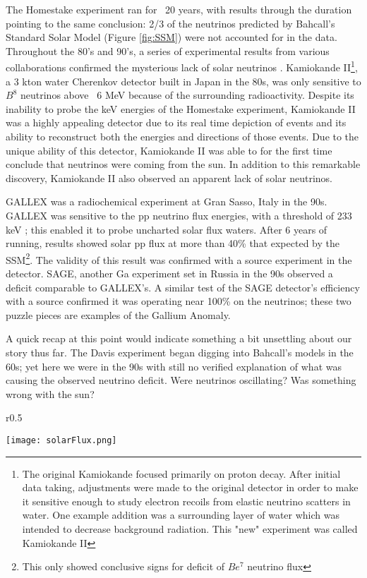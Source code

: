 \documentclass[12pt]{article}
\begin{document}
\par The Homestake experiment ran for ~20 years, with results through the duration pointing to the same conclusion: 2/3 of the neutrinos predicted by Bahcall's Standard Solar Model (Figure \ref{fig:SSM}) were not accounted for in the data\cite{ray0}.  Throughout the 80's and 90's, a series of experimental results from various collaborations confirmed the mysterious lack of solar neutrinos \cite{rayreview} \cite{kam0} \cite{sno}.  Kamiokande II\footnote{The original Kamiokande focused primarily on proton decay. After initial data taking, adjustments were made to the original detector in order to make it sensitive enough to study electron recoils from elastic neutrino scatters in water. One example addition was a surrounding layer of water which was intended to decrease background radiation.  This "new" experiment was called Kamiokande II}, a 3 kton water Cherenkov detector built in Japan in the 80s, was only sensitive to $B^8$ neutrinos above ~6 MeV\cite{kam0} because of the surrounding radioactivity. Despite its inability to probe the keV energies of the Homestake experiment, Kamiokande II was a highly appealing detector due to its real time depiction of events and its ability to reconstruct both the energies and directions of those events\cite{kam0}. Due to the unique ability of this detector, Kamiokande II was able to for the first time conclude that neutrinos were coming from the sun.  In addition to this remarkable discovery, Kamiokande II also observed an apparent lack of solar neutrinos.


\par GALLEX was a radiochemical experiment at Gran Sasso, Italy in the 90s. GALLEX was sensitive to the pp neutrino flux energies, with a threshold of 233 keV \cite{gal0}; this enabled it to probe uncharted solar flux waters.   After 6 years of running, results showed solar pp flux at more than 40\% that expected by the SSM\footnote{This only showed conclusive signs for deficit of $Be^7$ neutrino flux}. The validity of this result was confirmed with a  source experiment in the detector\cite{gal2}. SAGE, another Ga experiment set in Russia in the 90s observed a deficit comparable to GALLEX's.   A similar test of the SAGE detector's efficiency with a  source confirmed it was operating near 100\% on the  neutrinos\cite{sage};  these two puzzle pieces are examples of the Gallium Anomaly.  
\par A quick recap at this point would indicate something a bit unsettling about our story thus far. The Davis experiment began digging into Bahcall's models in the 60s; yet here we were in the 90s with still no verified explanation of what was causing the observed neutrino deficit.  Were neutrinos oscillating? Was something wrong with the sun\cite{Clarke}? 
\\ \begin{wrapfigure}{r}{0.5\textwidth}
\begin{center}
\captionsetup{justification=centering}
\texttt{[image: solarFlux.png]}
\end{center}
\caption{John Bahcall's Standard Solar Flux Model}
\label{fig:SSM}
\end{wrapfigure}
\end{document}
